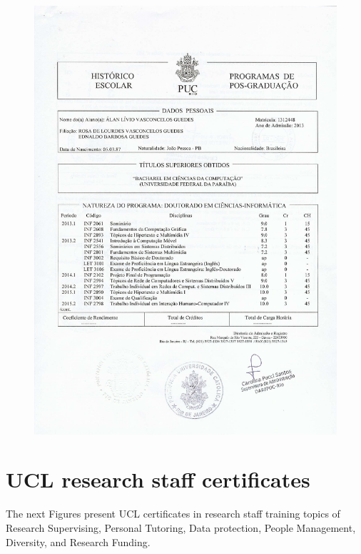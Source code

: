 \documentclass[10pt,a4paper,sans,colorlinks]{moderncv}
\begin{document}
\begin{figure}
    \centering
    \includegraphics[align=t,page=2,width=\textwidth,height=0.75\textheight, keepaspectratio=true]{certificates/phd-grades.pdf}
\end{figure}

\newpage
\section{UCL research staff certificates}
The next Figures present UCL certificates in research staff training topics of Research Supervising, Personal Tutoring, Data protection, People Management, Diversity, and Research Funding.
\end{document}
